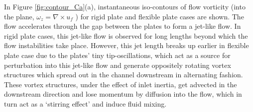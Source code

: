 \documentclass[%
 aip,
 amsmath,amssymb,
 reprint,
]{revtex4-1}
\begin{document}
In Figure \ref{fig:contour_Ca}(a), instantaneous iso-contours of flow vorticity (into the plane, $\omega_z=\nabla\times u_f$ ) for rigid plate and flexible plate cases are shown. The flow accelerates through the gap between the plates to form a jet-like flow. In rigid plate cases, this jet-like flow is observed for long lengths beyond which the flow instabilities take place. However, this jet length breaks up earlier in flexible plate case due to the plates' tiny tip-oscillations, which act as a source for perturbation into this jet-like flow and generate oppositely rotating vortex structures which spread out in the channel downstream in alternating fashion. These vortex structures, under the effect of inlet inertia, get advected in the downstream direction and lose momentum by diffusion into the flow, which in turn act as a `stirring effect' and induce fluid mixing.
\end{document}
